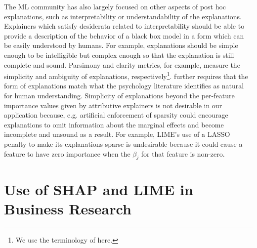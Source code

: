 \documentclass[12pt]{article}  %
\begin{document}
  The ML community has also largely focused on other aspects of post hoc explanations, such as interpretability or understandability of the explanations. Explainers which satisfy desiderata related to interpretability should be able to provide a description of the behavior of a black box model in a form which can be easily understood by humans. For example, explanations should be simple enough to be intelligible but complex enough so that the explanation is still complete and sound. Parsimony \citep{nguyen2020quantitative} and clarity \citep{lakkaraju2017interpretable,montavon2018methods,alvarez18robustness} metrics, for example, measure the simplicity and ambiguity of explanations, respectively\footnote{We use the terminology of \cite{markus2021role} here.}. \cite{jacovi2023diagnosing} further requires that the form of explanations match what the psychology literature identifies as natural for human understanding.  Simplicity of explanations beyond the per-feature importance values given by attributive explainers is not desirable in our application because, e.g. artificial enforcement of sparsity could encourage explanations to omit information about the marginal effects and become incomplete and unsound as a result. For example, LIME's use of a LASSO penalty to make its explanations sparse is undesirable because it could cause a feature to have zero importance when the $\beta_j$ for that feature is non-zero. %

    
   
    
    
    \section{Use of SHAP and LIME in Business Research}
\end{document}
